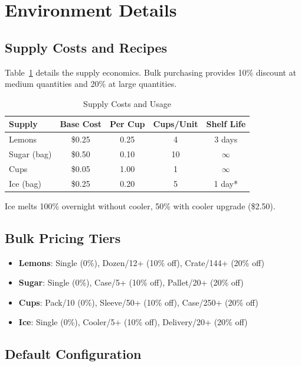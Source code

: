 \section{Environment Details}
\label{app:environment}

\subsection{Supply Costs and Recipes}

Table~\ref{tab:supplies} details the supply economics. Bulk purchasing provides 10\% discount at medium quantities and 20\% at large quantities.

\begin{table}[h]
\centering
\caption{Supply Costs and Usage}
\label{tab:supplies}
\begin{tabular}{@{}lcccc@{}}
\toprule
\textbf{Supply} & \textbf{Base Cost} & \textbf{Per Cup} & \textbf{Cups/Unit} & \textbf{Shelf Life} \\
\midrule
Lemons & \$0.25 & 0.25 & 4 & 3 days \\
Sugar (bag) & \$0.50 & 0.10 & 10 & $\infty$ \\
Cups & \$0.05 & 1.00 & 1 & $\infty$ \\
Ice (bag) & \$0.25 & 0.20 & 5 & 1 day* \\
\bottomrule
\end{tabular}
\begin{flushleft}
\small *Ice melts 100\% overnight without cooler, 50\% with cooler upgrade (\$2.50).
\end{flushleft}
\end{table}

\subsection{Bulk Pricing Tiers}

\begin{itemize}
    \item \textbf{Lemons}: Single (0\%), Dozen/12+ (10\% off), Crate/144+ (20\% off)
    \item \textbf{Sugar}: Single (0\%), Case/5+ (10\% off), Pallet/20+ (20\% off)
    \item \textbf{Cups}: Pack/10 (0\%), Sleeve/50+ (10\% off), Case/250+ (20\% off)
    \item \textbf{Ice}: Single (0\%), Cooler/5+ (10\% off), Delivery/20+ (20\% off)
\end{itemize}

\subsection{Default Configuration}


